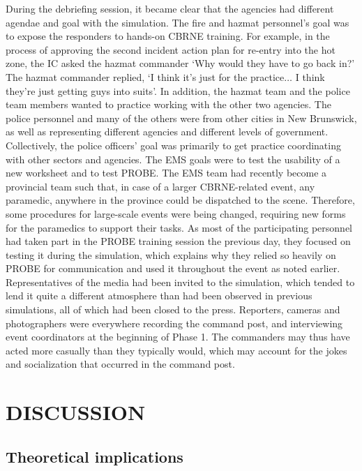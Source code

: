 \documentclass[link]{IWCOMP}
\begin{document}
During the debriefing session, it became clear that the agencies had
different agendae and goal with the simulation. The fire and hazmat
personnel's goal was to expose the responders to hands-on CBRNE training.
For example, in the process of approving the second incident action plan for
re-entry into the hot zone, the IC asked the hazmat commander `Why would
they have to go back in?' The hazmat commander replied, `I think it's just
for the practice$\ldots$ I think they're just getting guys into suits'. In
addition, the hazmat team and the police team members wanted to practice
working with the other two agencies. The police personnel and many of the
others were from other cities in New Brunswick, as well as representing
different agencies and different levels of government. Collectively, the
police officers' goal was primarily to get practice coordinating with other
sectors and agencies. The EMS goals were to test the usability of a new
worksheet and to test PROBE. The EMS team had recently become a provincial
team such that, in case of a larger CBRNE-related event, any paramedic,
anywhere in the province could be dispatched to the scene. Therefore, some
procedures for large-scale events were being changed, requiring new forms
for the paramedics to support their tasks. As most of the participating
personnel had taken part in the PROBE training session the previous day,
they focused on testing it during the simulation, which explains why they
relied so heavily on PROBE for communication and used it throughout the
event as noted earlier. Representatives of the media had been invited to the
simulation, which tended to lend it quite a different atmosphere than had
been observed in previous simulations, all of which had been closed to the
press. Reporters, cameras and photographers were everywhere recording the
command post, and interviewing event coordinators at the beginning of Phase
1. The commanders may thus have acted more casually than they typically
would, which may account for the jokes and socialization that occurred in
the command post.

\section{DISCUSSION}\label{sec5}

\subsection{Theoretical implications}\label{subsec5.1}
\end{document}

